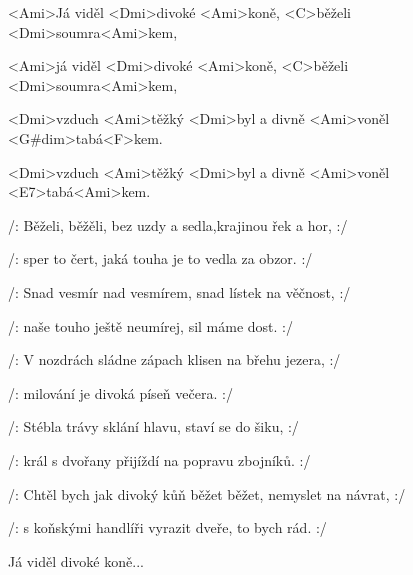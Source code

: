 

\zs
<Ami>Já viděl <Dmi>divoké <Ami>koně, <C>běželi 
<Dmi>soumra<Ami>kem, 

<Ami>já viděl <Dmi>divoké <Ami>koně, <C>běželi 
<Dmi>soumra<Ami>kem, 

<Dmi>vzduch <Ami>těžký <Dmi>byl a divně <Ami>voněl 
<G#dim>tabá<F>kem. 

<Dmi>vzduch <Ami>těžký <Dmi>byl a divně <Ami>voněl 
<E7>tabá<Ami>kem. \ks

\zs
/: Běželi, běžěli, bez uzdy a sedla,krajinou řek a hor, :/

/: sper to čert, jaká touha je to vedla za obzor. :/
\ks

\zs
/: Snad vesmír nad vesmírem, snad lístek na věčnost, :/

/: naše touho ještě neumírej, sil máme dost. :/
\ks

\zs
/: V nozdrách sládne zápach klisen na břehu jezera, :/

/: milování je divoká píseň večera. :/
\ks

\zs
/: Stébla trávy sklání hlavu, staví se do šiku, :/

/: král s dvořany přijíždí na popravu zbojníků. :/
\ks

\zs
/: Chtěl bych jak divoký kůň běžet běžet, nemyslet na návrat, :/

/: s koňskými handlíři vyrazit dveře, to bych rád. :/
\ks



Já viděl divoké koně... \kp
